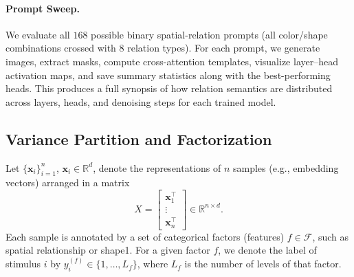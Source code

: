 \documentclass[10pt,twocolumn,letterpaper]{article}
\begin{document}
\paragraph{Prompt Sweep.}
We evaluate all $168$ possible binary spatial-relation prompts (all color/shape combinations crossed with 8 relation types). For each prompt, we generate images, extract masks, compute cross-attention templates, visualize layer–head activation maps, and save summary statistics along with the best-performing heads. This produces a full synopsis of how relation semantics are distributed across layers, heads, and denoising steps for each trained model.

\clearpage
\subsection{Variance Partition and Factorization}\label{method:variance_partitioning}

Let $\{\mathbf{x}_i\}_{i=1}^n$, $\mathbf{x}_i \in \mathbb{R}^d$, denote the representations of $n$ samples (e.g., embedding vectors) arranged in a matrix
\begin{equation}
    X = 
    \begin{bmatrix}
        \mathbf{x}_1^\top \\
        \vdots \\
        \mathbf{x}_n^\top
    \end{bmatrix}
    \in \mathbb{R}^{n \times d}.
\end{equation}
Each sample is annotated by a set of categorical factors (features) $f \in \mathcal{F}$, such as spatial relationship or shape1. For a given factor $f$, we denote the label of stimulus $i$ by $y_i^{(f)} \in \{1,\dots,L_f\}$, where $L_f$ is the number of levels of that factor.
\end{document}

